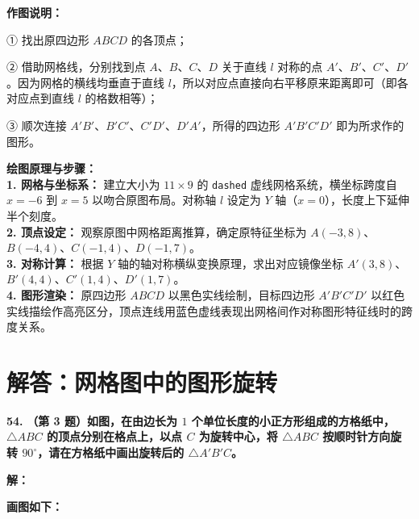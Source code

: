 \vspace{0.4cm}
\textbf{作图说明：}

① 找出原四边形 $ABCD$ 的各顶点；

② 借助网格线，分别找到点 $A$、$B$、$C$、$D$ 关于直线 $l$ 对称的点 $A'$、$B'$、$C'$、$D'$。因为网格的横线均垂直于直线 $l$，所以对应点直接向右平移原来距离即可（即各对应点到直线 $l$ 的格数相等）；

③ 顺次连接 $A'B'$、$B'C'$、$C'D'$、$D'A'$，所得的四边形 $A'B'C'D'$ 即为所求作的图形。

\vspace{0.4cm}
{\small\color{blue!70!black}
\textbf{绘图原理与步骤：}\\
\textbf{1. 网格与坐标系：} 建立大小为 $11 \times 9$ 的 \texttt{dashed} 虚线网格系统，横坐标跨度自 $x=-6$ 到 $x=5$ 以吻合原图布局。对称轴 $l$ 设定为 $Y$ 轴（$x=0$），长度上下延伸半个刻度。\\
\textbf{2. 顶点设定：} 观察原图中网格距离推算，确定原特征坐标为 $A(-3,8)$、$B(-4,4)$、$C(-1,4)$、$D(-1,7)$。\\
\textbf{3. 对称计算：} 根据 $Y$ 轴的轴对称横纵变换原理，求出对应镜像坐标 $A'(3,8)$、$B'(4,4)$、$C'(1,4)$、$D'(1,7)$。\\
\textbf{4. 图形渲染：} 原四边形 $ABCD$ 以黑色实线绘制，目标四边形 $A'B'C'D'$ 以红色实线描绘作高亮区分，顶点连线用蓝色虚线表现出网格间作对称图形特征线时的跨度关系。
}

\newpage



\newpage

\section{解答：网格图中的图形旋转}

\vspace{0.6cm}

\textbf{\LARGE 54.} \textbf{（第 3 题）如图，在由边长为 $1$ 个单位长度的小正方形组成的方格纸中，$\triangle ABC$ 的顶点分别在格点上，以点 $C$ 为旋转中心，将 $\triangle ABC$ 按顺时针方向旋转 $90^\circ$，请在方格纸中画出旋转后的 $\triangle A'B'C$。}

\vspace{0.4cm}
\textbf{解：}

\textbf{画图如下：}

